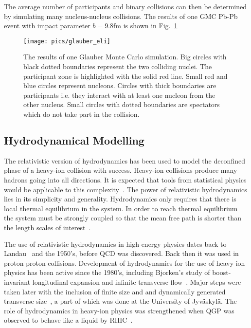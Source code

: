 \noindent The average number of participants and binary collisions can then be determined by simulating many nucleus-nucleus collisions. The results of one GMC Pb-Pb event with impact parameter $b=9.8\mathrm{fm}$ is shown in Fig.~\ref{fig:GMC}

\begin{figure}[htbp]
\centering
               \texttt{[image: pics/glauber\_eli]}
        \caption[The results of one Glauber Monte Carlo simulation.]{The results of one Glauber Monte Carlo simulation. Big circles with black dotted boundaries represent the two colliding nuclei. The participant zone is highlighted with the solid red line.        
        Small red and blue circles represent nucleons. Circles with thick boundaries are participants i.e. they interact with at least one nucleon from the other nucleus. Small circles with dotted boundaries are spectators which do not take part in the collision.}
        	\label{fig:GMC}
\end{figure}



\subsection{Hydrodynamical Modelling}
\label{sec:hydro}
The relativistic version of hydrodynamics has been used to model the deconfined phase of a heavy-ion collision with success. Heavy-ion collisions produce many hadrons going into all directions. It is expected that tools from statistical physics would be applicable to this complexity~\cite{Ollitrault:2007du}. The power of relativistic hydrodynamics lies in its simplicity and generality. Hydrodynamics only requires that there is local thermal equilibrium in the system. In order to reach thermal equilibrium the system must be strongly coupled so that the mean free path is shorter than the length scales of interest~\cite{Romatschke:2009im}.

The use of relativistic hydrodynamics in high-energy physics dates back to Landau~\cite{Landau:1953gs} and the 1950's, before QCD was discovered. Back then it was used in proton-proton collisions. Development of hydrodynamics for the use of heavy-ion physics has been active since the 1980's, including Bjorken's study of boost-invariant longitudinal expansion and infinite transverse flow~\cite{PhysRevD.27.140}. Major steps were taken later with the inclusion of finite size and and dynamically generated transverse size~\cite{Baym1983541, PhysRevD.34.794}, a part of which was done at the University of Jyväskylä. The role of hydrodynamics in heavy-ion physics was strengthened when QGP was observed to behave like a liquid by RHIC~\cite{Adcox:2004mh}. 

